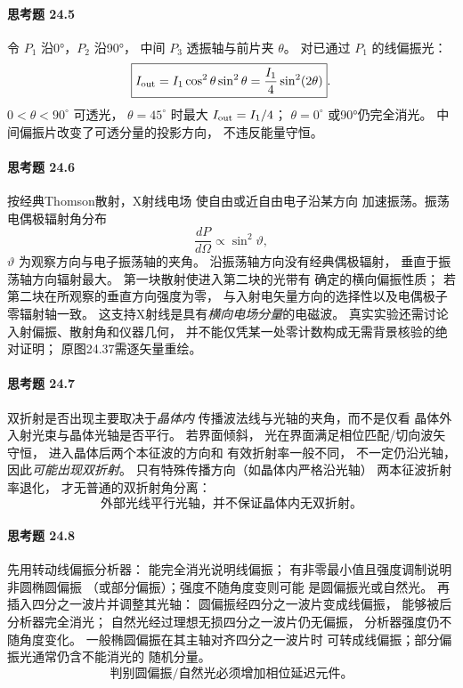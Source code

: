 \paragraph{思考题 24.5}
令 \(P_1\) 沿0°，\(P_2\) 沿90°，
中间 \(P_3\) 透振轴与前片夹 \(\theta\)。
对已通过 \(P_1\) 的线偏振光：
\[
\boxed{I_{\rm out}=I_1\cos^2\theta\sin^2\theta
=\frac{I_1}{4}\sin^2(2\theta)}.
\]
\(0<\theta<90^\circ\) 可透光，
\(\theta=45^\circ\) 时最大
\(I_{\rm out}=I_1/4\)；
\(\theta=0^\circ\) 或90°仍完全消光。
中间偏振片改变了可透分量的投影方向，
不违反能量守恒。

\paragraph{思考题 24.6}
按经典Thomson散射，X射线电场
使自由或近自由电子沿某方向
加速振荡。振荡电偶极辐射角分布
\[
\boxed{\frac{dP}{d\Omega}\propto\sin^2\vartheta},
\]
\(\vartheta\) 为观察方向与电子振荡轴的夹角。
沿振荡轴方向没有经典偶极辐射，
垂直于振荡轴方向辐射最大。
第一块散射使进入第二块的光带有
确定的横向偏振性质；
若第二块在所观察的垂直方向强度为零，
与入射电矢量方向的选择性以及电偶极子零辐射轴一致。
这支持X射线是具有\emph{横向电场分量}的电磁波。
真实实验还需讨论入射偏振、散射角和仪器几何，
并不能仅凭某一处零计数构成无需背景核验的绝对证明；
原图24.37需逐矢量重绘。

\paragraph{思考题 24.7}
双折射是否出现主要取决于\emph{晶体内}
传播波法线与光轴的夹角，而不是仅看
晶体外入射光束与晶体光轴是否平行。
若界面倾斜，
光在界面满足相位匹配/切向波矢守恒，
进入晶体后两个本征波的方向和
有效折射率一般不同，
不一定仍沿光轴，
因此\emph{可能出现双折射}。
只有特殊传播方向（如晶体内严格沿光轴）
两本征波折射率退化，
才无普通的双折射角分离：
\[
\boxed{\text{外部光线平行光轴，并不保证晶体内无双折射。}}
\]

\paragraph{思考题 24.8}
先用转动线偏振分析器：
能完全消光说明线偏振；
有非零最小值且强度调制说明非圆椭圆偏振
（或部分偏振）；强度不随角度变则可能
是圆偏振光或自然光。
再插入四分之一波片并调整其光轴：
圆偏振经四分之一波片变成线偏振，
能够被后分析器完全消光；
自然光经过理想无损四分之一波片仍无偏振，
分析器强度仍不随角度变化。
一般椭圆偏振在其主轴对齐四分之一波片时
可转成线偏振；部分偏振光通常仍含不能消光的
随机分量。
\[
\boxed{\text{判别圆偏振/自然光必须增加相位延迟元件。}}
\]

